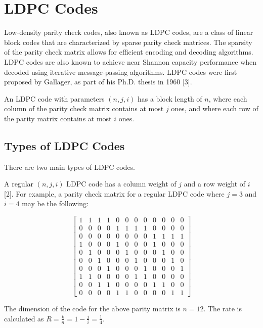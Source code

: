 \documentclass[conference]{IEEEtran}
\begin{document}
\section{LDPC Codes}
Low-density parity check codes, also known as LDPC codes, are a class of linear block
codes that are characterized by sparse parity check matrices. The sparsity of
the parity check matrix allows for efficient encoding and decoding algorithms.
LDPC codes are also known to achieve near Shannon capacity performance when
decoded using iterative message-passing algorithms.
LDPC codes were first proposed by Gallager, as part of his Ph.D. thesis in 1960 [3].

An LDPC code with parameters $(n,j,i)$ has a block length of $n$, where each column of the parity check matrix contains at most $j$ ones, and where each row of the parity matrix contains at most $i$ ones.

\subsection{Types of LDPC Codes}
There are two main types of LDPC codes.

A regular $(n,j,i)$ LDPC code has a column weight of $j$ and a row weight of $i$ [2].
For example, a parity check matrix for a regular LDPC code where $j=3$ and $i=4$ may be the following:

$$\begin{bmatrix}
    1 & 1 & 1 & 1 & 0 & 0 & 0 & 0 & 0 & 0 & 0 & 0 \\
    0 & 0 & 0 & 0 & 1 & 1 & 1 & 1 & 0 & 0 & 0 & 0 \\
    0 & 0 & 0 & 0 & 0 & 0 & 0 & 0 & 1 & 1 & 1 & 1 \\
    1 & 0 & 0 & 0 & 1 & 0 & 0 & 0 & 1 & 0 & 0 & 0 \\
    0 & 1 & 0 & 0 & 0 & 1 & 0 & 0 & 0 & 1 & 0 & 0 \\
    0 & 0 & 1 & 0 & 0 & 0 & 1 & 0 & 0 & 0 & 1 & 0 \\
    0 & 0 & 0 & 1 & 0 & 0 & 0 & 1 & 0 & 0 & 0 & 1 \\
    1 & 1 & 0 & 0 & 0 & 0 & 1 & 1 & 0 & 0 & 0 & 0 \\
    0 & 0 & 1 & 1 & 0 & 0 & 0 & 0 & 1 & 1 & 0 & 0 \\
    0 & 0 & 0 & 0 & 1 & 1 & 0 & 0 & 0 & 0 & 1 & 1
  \end{bmatrix}$$

The dimension of the code for the above parity matrix is $n=12$.
The rate is calculated as $R=\frac{k}{n}=1-\frac{j}{i}=\frac{1}{4}$.
\end{document}
